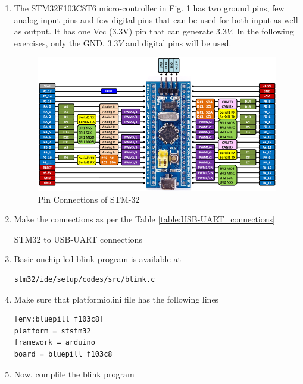 \begin{enumerate}[label=\arabic*.,ref=\theenumi]
\item The STM32F103C8T6 micro-controller in Fig. \ref{fig:stm_blue} has two ground pins, few analog input pins and few digital pins that can be used for both input as well as output. It has one Vcc (3.3V) pin that can generate 3.3$V$.  In the following exercises, only the GND, 3.3$V$ and digital pins will be used.
%
\begin{figure}[!htb]
\begin{center}
\includegraphics[width=\columnwidth]{stm32/sevenseg/figs/stm_blue}
\end{center}
\caption{Pin Connections of STM-32}
\label{fig:stm_blue}
\end{figure}
\item Make the connections as per the Table \ref{table:USB-UART_connections}
\begin{table}[!h]
\centering

\caption{STM32 to USB-UART connections}
\label{table:USB-UART_connections}
\end{table}
\item Basic onchip led blink program is available at 
\begin{lstlisting}
stm32/ide/setup/codes/src/blink.c
\end{lstlisting}
\item Make sure that platformio.ini file has the following lines
\begin{lstlisting}
[env:bluepill_f103c8]
platform = ststm32
framework = arduino
board = bluepill_f103c8
\end{lstlisting}
\item Now, complile the blink program

\end{enumerate}
